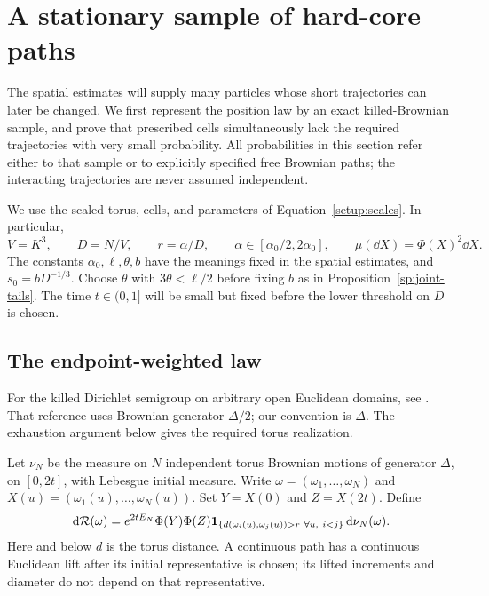 \section{A stationary sample of hard-core paths}\label{path:section}

The spatial estimates will supply many particles whose short trajectories
can later be changed.  We first represent the position law by an exact
killed-Brownian sample, and prove that prescribed cells simultaneously lack
the required trajectories with very small probability.  All probabilities
in this section refer either to that sample or to explicitly specified free
Brownian paths; the interacting trajectories are never assumed independent.

We use the scaled torus, cells, and parameters of
Equation~\eqref{setup:scales}.  In particular,
\[
 V=K^3,\qquad D=N/V,\qquad r=\alpha/D,
 \qquad \alpha\in[\alpha_0/2,2\alpha_0],\qquad
 \mu(\dd X)=\Phi(X)^2\dd X.
\]
The constants $\alpha_0,\ell,\theta,b$ have the meanings fixed in the
spatial estimates, and $s_0=bD^{-1/3}$.  Choose $\theta$ with
$3\theta<\ell/2$ before fixing $b$ as in
Proposition~\ref{sp:joint-tails}.  The time $t\in(0,1]$ will be small but
fixed before the lower threshold on $D$ is chosen.

\subsection{The endpoint-weighted law}

For the killed Dirichlet semigroup on arbitrary open Euclidean domains,
see \cite[arXiv version~2, Proposition~2.9 and Theorem~6.1]{BroderixHundertmarkLeschke2000Semigroups}.
That reference uses Brownian generator $\Delta/2$; our convention is
$\Delta$. The exhaustion argument below gives the required torus realization.

Let $\nu_N$ be the measure on $N$ independent torus Brownian motions
of generator $\Delta$, on $[0,2t]$, with Lebesgue initial measure.
Write $\omega=(\omega_1,\ldots,\omega_N)$ and
$X(u)=(\omega_1(u),\ldots,\omega_N(u))$.  Set $Y=X(0)$ and $Z=X(2t)$.
Define
\begin{equation}\label{path:law}
 \,\mathrm d\mathcal R(\omega)=e^{2tE_N}\Phi(Y)\Phi(Z)
 \mathbf 1_{\{d(\omega_i(u),\omega_j(u))>r\ \forall u,\ i<j\}}
 \,\mathrm d\nu_N(\omega).
\end{equation}
Here and below $d$ is the torus distance.  A continuous path has a
continuous Euclidean lift after its initial representative is chosen;
its lifted increments and diameter do not depend on that representative.

